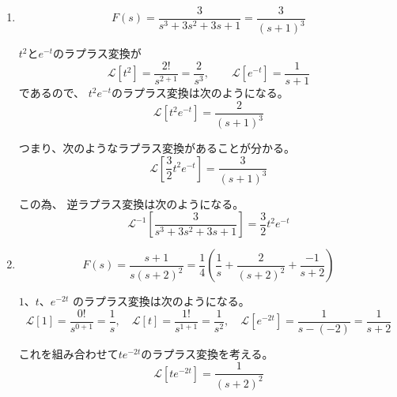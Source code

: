 \documentclass[12pt,b5paper]{ltjsarticle}
\begin{document}
\begin{enumerate}
 \item

      \begin{equation}
       F(s) = \frac{3}{s^3+3s^2+3s+1}
        = \frac{3}{(s+1)^3}
      \end{equation}

      $t^2$と$e^{-t}$のラプラス変換が
      \begin{equation}
       \mathcal{L}[t^2] = \frac{2!}{s^{2+1}} = \frac{2}{s^{3}}
       ,\qquad
       \mathcal{L}[e^{-t}] = \frac{1}{s+1}
      \end{equation}
      であるので、
      $t^{2}e^{-t}$のラプラス変換は次のようになる。
      \begin{equation}
       \mathcal{L}[t^{2}e^{-t}] = \frac{2}{(s+1)^{3}}
      \end{equation}

      つまり、次のようなラプラス変換があることが分かる。
      \begin{equation}
       \mathcal{L}\left[ \frac{3}{2}t^{2}e^{-t} \right] = \frac{3}{(s+1)^{3}}
      \end{equation}

      この為、
      逆ラプラス変換は次のようになる。
      \begin{equation}
       \mathcal{L}^{-1}\left[ \frac{3}{s^3+3s^2+3s+1} \right]
        = \frac{3}{2}t^{2}e^{-t}
      \end{equation}

      \dotfill

 \item

      \begin{equation}
       F(s) = \frac{s+1}{s(s+2)^2}
        = \frac{1}{4}\left( \frac{1}{s} + \frac{2}{(s+2)^2} + \frac{-1}{s+2} \right)
      \end{equation}

      $1$、$t$、$e^{-2t}$ のラプラス変換は次のようになる。
      \begin{equation}
       \mathcal{L}[1] = \frac{0!}{s^{0+1}} = \frac{1}{s}
        ,\quad
       \mathcal{L}[t] = \frac{1!}{s^{1+1}} = \frac{1}{s^{2}}
        ,\quad
       \mathcal{L}[e^{-2t}] = \frac{1}{s-(-2)} = \frac{1}{s+2}
      \end{equation}

      これを組み合わせて$te^{-2t}$のラプラス変換を考える。
      \begin{equation}
       \mathcal{L}[te^{-2t}] = \frac{1}{(s+2)^2}
      \end{equation}


\end{enumerate}
\end{document}
